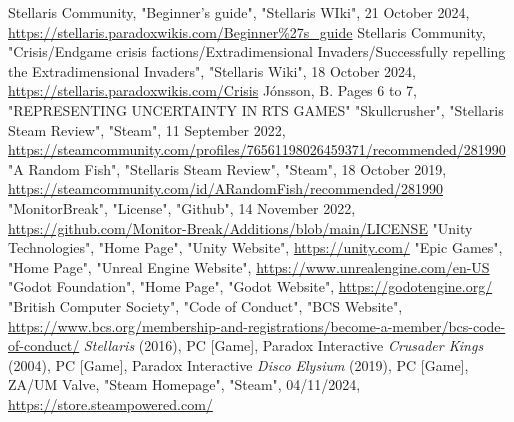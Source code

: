 \documentclass{report}
\begin{document}
\renewcommand\bibname{References}
\begin{thebibliography}{9}
Stellaris Community, "Beginner's guide", "Stellaris WIki", 21 October 2024, \href{https://stellaris.paradoxwikis.com/Beginner\%27s_guide}{https://stellaris.paradoxwikis.com/Beginner\%27s\_guide}
Stellaris Community, "Crisis/Endgame crisis factions/Extradimensional Invaders/Successfully repelling the Extradimensional Invaders", "Stellaris Wiki", 18 October 2024, \href{https://stellaris.paradoxwikis.com/Crisis#Successfully_repelling_the_Extradimensional_Invaders, Crisis Solution Link}{https://stellaris.paradoxwikis.com/Crisis}
Jónsson, B. Pages 6 to 7, "REPRESENTING UNCERTAINTY IN RTS GAMES"
"Skullcrusher", "Stellaris Steam Review", "Steam", 11 September 2022, \href{https://steamcommunity.com/profiles/76561198026459371/recommended/281990, "Review Link"}{https://steamcommunity.com/profiles/76561198026459371/recommended/281990}
"A Random Fish", "Stellaris Steam Review", "Steam", 18 October 2019, \href{https://steamcommunity.com/id/ARandomFish/recommended/281990, "Review Link"}{https://steamcommunity.com/id/ARandomFish/recommended/281990}
"MonitorBreak", "License", "Github", 14 November 2022, \href{https://github.com/Monitor-Break/Additions/blob/main/LICENSE}{https://github.com/Monitor-Break/Additions/blob/main/LICENSE}
"Unity Technologies", "Home Page", "Unity Website", \href{https://unity.com/}{https://unity.com/}
"Epic Games", "Home Page", "Unreal Engine Website", \href{https://www.unrealengine.com/en-US}{https://www.unrealengine.com/en-US}
"Godot Foundation", "Home Page", "Godot Website", \href{https://godotengine.org/}{https://godotengine.org/}
"British Computer Society", "Code of Conduct", "BCS Website", \href{https://www.bcs.org/membership-and-registrations/become-a-member/bcs-code-of-conduct/}{https://www.bcs.org/membership-and-registrations/become-a-member/bcs-code-of-conduct/}
\textit{Stellaris} (2016), PC [Game], Paradox Interactive
\textit{Crusader Kings} (2004), PC [Game], Paradox Interactive
\textit{Disco Elysium} (2019), PC [Game], ZA/UM
Valve, "Steam Homepage", "Steam", 04/11/2024, \href{https://store.steampowered.com/}{https://store.steampowered.com/}
\end{thebibliography}
\end{document}
